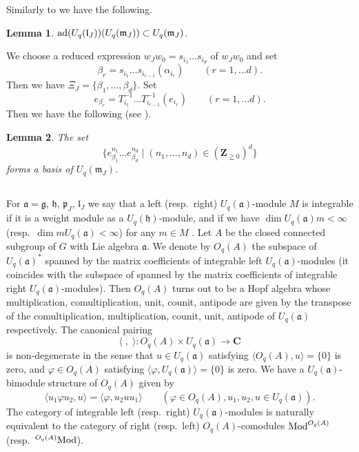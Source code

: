 \documentclass[a4paper, 12pt, leqno]{amsart}
\newtheorem{lemma}{{\sc Lemma}}[section]
\theoremstyle{definition}
\numberwithin{equation}{section}
\def\Ga{{\mathfrak{a}}}
\def\Gg{{\mathfrak{g}}}
\def\Gh{{\mathfrak{h}}}
\def\Gl{{\mathfrak{l}}}
\def\Gm{{\mathfrak{m}}}
\def\Gp{{\mathfrak{p}}}
\def\BC{{\mathbf{C}}}
\def\BZ{{\mathbf{Z}}}
\def\ad{{\mathop{\rm ad}\nolimits}}
\def\inte{{\mathop{\rm int}\nolimits}}
\def\Mod{\mathop{\rm Mod}\nolimits}
\begin{document}
Similarly to \cite{KMT} 
we have the following.
\begin{lemma}
\label{lem:adUm}
$\ad(U_q(\Gl_J))(U_q(\Gm_J))\subset U_q(\Gm_J)$.
\end{lemma}




We choose a reduced expression 
$w_Jw_0=s_{i_1}\dots s_{i_d}$ of $w_Jw_0$ and set
\begin{equation}
\label{eq:beta}
\beta_r=s_{i_1}\dots s_{i_{r-1}}(\alpha_{i_r})
\qquad(r=1,\dots d).
\end{equation}
Then we have $\Xi_J=\{\beta_1,\dots, \beta_d\}$.
Set 
\begin{equation}
\label{eq:b}
e_{\beta_r}=T_{i_1}^{-1}\dots T_{i_{r-1}}^{-1}(e_{i_r})
\qquad(r=1,\dots d).
\end{equation}
Then we have the following (see \cite[Proposition 40.2.1]{Lb}).
\begin{lemma}
\label{lem:basis}
The set
\[
\{
e_{\beta_1}^{n_1}\dots e_{\beta_d}^{n_d}\mid
(n_1,\dots,n_d)\in(\BZ_{\geqq0})^d\}
\]
forms a basis of $U_q(\Gm_J)$.
\end{lemma}
\subsection{}
For $\Ga=\Gg$, $\Gh$, $\Gp_J$, $\Gl_J$ we say that a left (resp.\ right) $U_q(\Ga)$-module $M$ is integrable if it is a weight module as a $U_q(\Gh)$-module, 
and if we have $\dim U_q(\Ga)m<\infty$
(resp.\ $\dim mU_q(\Ga)<\infty$)
for any $m\in M$ .
Let $A$ be the closed connected subgroup of $G$ with Lie algebra $\Ga$.
We denote by $O_q(A)$ the subspace of $U_q(\Ga)^*$ spanned by the matrix coefficients of  integrable left $U_q(\Ga)$-modules 
(it coincides with the subspace of spanned by the matrix coefficients of  integrable right $U_q(\Ga)$-modules).
Then $O_q(A)$ turns out to be a Hopf algebra whose multiplication, comultiplication, unit, counit, antipode are given by the transpose of the 
comultiplication, multiplication, counit, unit, antipode of $U_q(\Ga)$ respectively.
The canonical pairing
\[
\langle\;,\;\rangle:O_q(A)\times U_q(\Ga)\to\BC
\]
is non-degenerate in the sense that 
$u\in U_q(\Ga)$ satisfying $\langle O_q(A),u\rangle=\{0\}$ is zero, and
$\varphi\in O_q(A)$ satisfying $\langle \varphi, U_q(\Ga)\rangle=\{0\}$ is zero.
We have a $U_q(\Ga)$-bimodule structure of $O_q(A)$ given by
\[
\langle u_1\varphi u_2,u\rangle=
\langle\varphi,u_2uu_1\rangle
\qquad(\varphi\in O_q(A), u_1, u_2, u\in U_q(\Ga)).
\]
The category of integrable left (resp.\ right) $U_q(\Ga)$-modules is naturally equivalent to the category of 
right (resp.\ left) $O_q(A)$-comodules $\Mod^{O_q(A)}$ (resp.\ ${}^{O_q(A)}\!\Mod$). 
\end{document}
